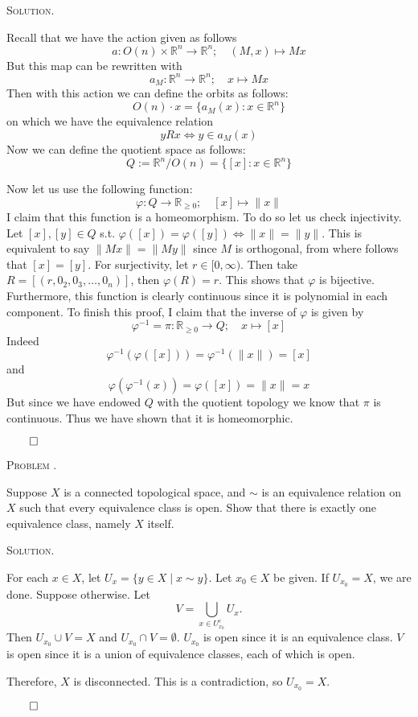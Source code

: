 \documentclass[12pt, a4paper, oneside]{ctexart}
\newcounter{problemname}
\newenvironment{problem}{\begin{framed}\stepcounter{problemname}\par\noindent\textsc{Problem \arabic{problemname}. }}{\end{framed}\par}
\newenvironment{solution}{%
	\par\noindent\textsc{Solution. }\ignorespaces
}{%
	\hfill$\qed$\par
}
\begin{document}
	\begin{solution}
	Recall that we have the action given as follows
	\[
	a : O(n) \times \mathbb{R}^n \to \mathbb{R}^n; \quad (M, x) \mapsto Mx
	\]
	But this map can be rewritten with
	\[
	a_M : \mathbb{R}^n \to \mathbb{R}^n; \quad x \mapsto Mx
	\]
	Then with this action we can define the orbits as follows:
	\[
	O(n) \cdot x = \{ a_M(x) : x \in \mathbb{R}^n \}
	\]
	on which we have the equivalence relation
	\[
	y R x \iff y \in a_M(x)
	\]
	Now we can define the quotient space as follows:
	\[
	Q := \mathbb{R}^n / O(n) = \{ [x] : x \in \mathbb{R}^n \}
	\]

	Now let us use the following function:
	\[
	\varphi : Q \to \mathbb{R}_{\geq 0}; \quad [x] \mapsto \|x\|
	\]
	I claim that this function is a homeomorphism. 
	To do so let us check injectivity. 
	Let \( [x], [y] \in Q \) s.t. \( \varphi([x]) = \varphi([y]) \iff \|x\| = \|y\| \). 
	This is equivalent to say \( \|Mx\| = \|My\| \) since \( M \) is orthogonal, 
	from where follows that \( [x] = [y] \). 
	For surjectivity, let \( r \in [0, \infty) \). 
	Then take \( R = [(r, 0_2, 0_3, \dots, 0_n)] \), then \( \varphi(R) = r \). 
	This shows that \( \varphi \) is bijective. 
	Furthermore, this function is clearly continuous since it is polynomial 
	in each component. To finish this proof, I claim that the inverse of 
	\( \varphi \) is given by
	\[
	\varphi^{-1} = \pi : \mathbb{R}_{\geq 0} \to Q; \quad x \mapsto [x]
	\]
	Indeed
	\[
	\varphi^{-1}(\varphi([x])) = \varphi^{-1}(\|x\|) = [x]
	\]
	and
	\[
	\varphi(\varphi^{-1}(x)) = \varphi([x]) = \|x\| = x
	\]
	But since we have endowed \( Q \) with the quotient topology 
	we know that \( \pi \) is continuous. Thus we have shown that it is homeomorphic.

		


	\end{solution}
	
	\begin{problem}
		
		Suppose \( X \) is a connected topological space, and \( \sim \) is an equivalence relation on 
        \( X \) such that every equivalence class is open. Show that there is exactly one equivalence class, namely \( X \) itself.

	\end{problem}
	
	\begin{solution}
		
		For each \( x \in X \), let \( U_x = \{ y \in X \mid x \sim y \} \). Let \( x_0 \in X \) be given. If \( U_{x_0} = X \), we are done. Suppose otherwise. Let 
	\[
	V = \bigcup_{x \in U_{x_0}^c} U_x.
	\]
	Then \( U_{x_0} \cup V = X \) and \( U_{x_0} \cap V = \emptyset \). \( U_{x_0} \) is open since it is an equivalence class. \( V \) is open since it is a union of equivalence classes, each of which is open.

	Therefore, \( X \) is disconnected. This is a contradiction, so \( U_{x_0} = X \).

	\end{solution}
\end{document}
